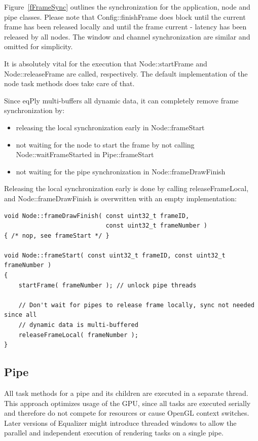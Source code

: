 \documentclass[10pt,a4]{scrartcl}
\newcommand{\fig}[1]{Figure~\ref{#1}}
\begin{document}
\fig{fFrameSync} outlines the synchronization for the application, node
and pipe classes. Please note that \textsf{Config::finishFrame} does
block until the current frame has been released locally and until the
frame \textsf{current - latency} has been released by all nodes. The
window and channel synchronization are similar and omitted for
simplicity.

It is absolutely vital for the execution that \textsf{Node::start\-Fra\-me}
and \textsf{Node::release\-Fra\-me} are called, respectively. The default
implementation of the node task methods does take care of that.

Since \textsf{eqPly} multi-buffers all dynamic data, it can completely
remove frame synchronization by:

\begin{itemize}
\item releasing the local synchronization early in \textsf{Node::frameStart}
\item not waiting for the node to start the frame by not calling
  \textsf{Node::waitFrameStarted} in \textsf{Pipe::frameStart}
\item not waiting for the pipe synchronization in \textsf{Node::frameDrawFinish}
\end{itemize}

Releasing the local synchronization early is done by calling
\textsf{releaseFrameLocal}, and \textsf{Node::frameDrawFinish} is
overwritten with an empty implementation:

{\footnotesize\begin{lstlisting}
void Node::frameDrawFinish( const uint32_t frameID,
                            const uint32_t frameNumber )
{ /* nop, see frameStart */ }

void Node::frameStart( const uint32_t frameID, const uint32_t frameNumber )
{
    startFrame( frameNumber ); // unlock pipe threads
    
    // Don't wait for pipes to release frame locally, sync not needed since all
    // dynamic data is multi-buffered
    releaseFrameLocal( frameNumber );
}
\end{lstlisting}}


\subsection{Pipe}

All task methods for a pipe and its children are executed in a separate
thread. This approach optimizes usage of the GPU, since all
tasks are executed serially and therefore do not compete for resources
or cause OpenGL context switches. Later versions of Equalizer might
introduce threaded windows to allow the parallel and independent
execution of rendering tasks on a single pipe.
\end{document}
